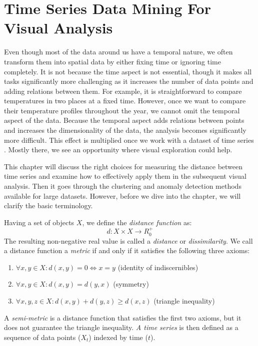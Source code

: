 \chapter{Time Series Data Mining For Visual Analysis}
Even though most of the data around us have a temporal nature, we often transform them into spatial data by either fixing time or ignoring time completely. It is not because the time aspect is not essential, though it makes all tasks significantly more challenging as it increases the number of data points and adding relations between them.  For example, it is straightforward to compare temperatures in two places at a fixed time. However, once we want to compare their temperature profiles throughout the year, we cannot omit the temporal aspect of the data. Because the temporal aspect adds relations between points and increases the dimensionality of the data, the analysis becomes significantly more difficult. This effect is multiplied once we work with a dataset of time series \cite{met:vis-data-help}. Mostly there, we see an opportunity where visual exploration could help.

This chapter will discuss the right choices for measuring the distance between time series and examine how to effectively apply them in the subsequent visual analysis. Then it goes through the clustering and anomaly detection methods available for large datasets. However, before we dive into the chapter, we will clarify the basic terminology.

Having a set of objects $X$, we define the \textit{distance function} as:
\begin{equation}
    d: X \times X \rightarrow R^{+}_0 
\end{equation}
The resulting non-negative real value is called a \textit{distance} or \textit{dissimilarity}. We call a distance function a \textit{metric} if and only if it satisfies the following three axioms:
\begin{enumerate}
    \item $\forall x, y \in X: d(x, y) = 0 \Leftrightarrow x = y $ (identity of indiscernibles)
    \item $\forall x, y \in X: d(x, y) = d(y, x)$ (symmetry)
    \item $\forall x, y, z \in X: d(x, y) + d(y, z) \ge d(x, z)$ (triangle inequality)
\end{enumerate}
A \textit{semi-metric} is a distance function that satisfies the first two axioms, but it does not guarantee the triangle inequality.
\textit{A time series} is then defined as a sequence of data points ($X_t$) indexed by time ($t$).

